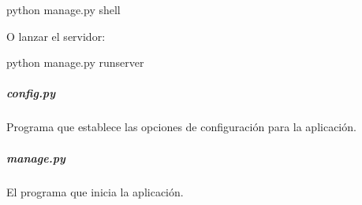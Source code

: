 \begin{sphinxVerbatim}[commandchars=\\\{\}]
\PYGZdl{} python manage.py shell
\end{sphinxVerbatim}

O lanzar el servidor:

\begin{sphinxVerbatim}[commandchars=\\\{\}]
\PYGZdl{} python manage.py runserver
\end{sphinxVerbatim}


\subparagraph{config.py}
\label{\detokenize{chapter_two/desc_cloudnao:config-py}}\label{\detokenize{chapter_two/desc_cloudnao:module-config}}
Programa que establece las opciones de configuración para la
aplicación.


\subparagraph{manage.py}
\label{\detokenize{chapter_two/desc_cloudnao:module-manage}}\label{\detokenize{chapter_two/desc_cloudnao:manage-py}}
El programa que inicia la aplicación.

